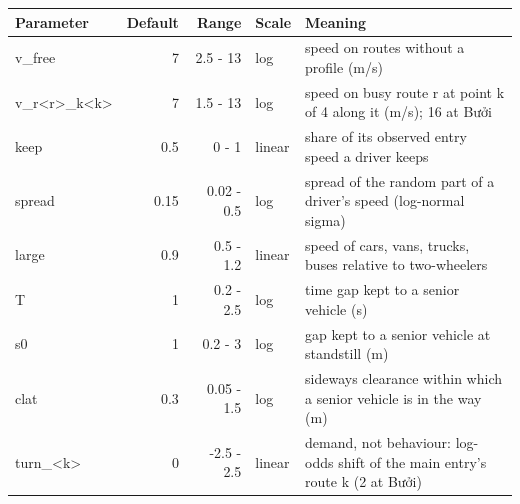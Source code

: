 \begin{tabular}{|l|r|r|l|p{6.5cm}|}
\hline
\textbf{Parameter} & \textbf{Default} & \textbf{Range} & \textbf{Scale} & \textbf{Meaning} \\
\hline
v\_free & 7 & 2.5 - 13 & log & speed on routes without a profile (m/s) \\
v\_r<r>\_k<k> & 7 & 1.5 - 13 & log & speed on busy route r at point k of 4 along it (m/s); 16 at Bưởi \\
keep & 0.5 & 0 - 1 & linear & share of its observed entry speed a driver keeps \\
spread & 0.15 & 0.02 - 0.5 & log & spread of the random part of a driver's speed (log-normal sigma) \\
large & 0.9 & 0.5 - 1.2 & linear & speed of cars, vans, trucks, buses relative to two-wheelers \\
T & 1 & 0.2 - 2.5 & log & time gap kept to a senior vehicle (s) \\
s0 & 1 & 0.2 - 3 & log & gap kept to a senior vehicle at standstill (m) \\
clat & 0.3 & 0.05 - 1.5 & log & sideways clearance within which a senior vehicle is in the way (m) \\
turn\_<k> & 0 & -2.5 - 2.5 & linear & demand, not behaviour: log-odds shift of the main entry's route k (2 at Bưởi) \\
\hline
\end{tabular}
